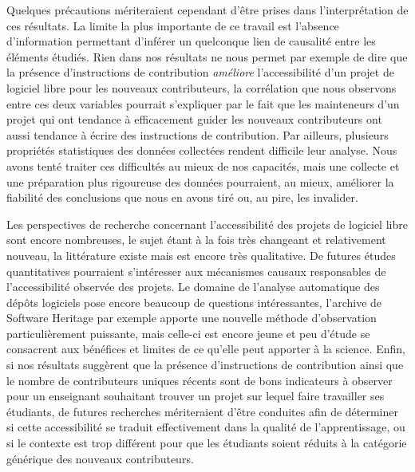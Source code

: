 \documentclass[dvipsnames,runningheads]{llncs}
\begin{document}
    Quelques précautions mériteraient cependant d'être prises dans l'interprétation de ces résultats. La
    limite la plus importante de ce travail est l'absence d'information permettant d'inférer un quelconque
    lien de causalité entre les éléments étudiés. Rien dans nos résultats ne nous permet par exemple de dire
    que la présence d'instructions de contribution \emph{améliore} l'accessibilité d'un projet de logiciel
    libre pour les nouveaux contributeurs, la corrélation que nous observons entre ces deux variables pourrait
    s'expliquer par le fait que les mainteneurs d'un projet qui ont tendance à efficacement guider les
    nouveaux contributeurs ont aussi tendance à écrire des instructions de contribution. Par ailleurs,
    plusieurs propriétés statistiques des données collectées rendent difficile leur analyse. Nous avons tenté
    traiter ces difficultés au mieux de nos capacités, mais une collecte et une préparation plus rigoureuse
    des données pourraient, au mieux, améliorer la fiabilité des conclusions que nous en avons tiré ou, au
    pire, les invalider.

    Les perspectives de recherche concernant l'accessibilité des projets de logiciel libre sont encore
    nombreuses, le sujet étant à la fois très changeant et relativement nouveau, la littérature existe mais
    est encore très qualitative. De futures études quantitatives pourraient s'intéresser aux mécanismes
    causaux responsables de l'accessibilité observée des projets. Le domaine de l'analyse automatique des
    dépôts logiciels pose encore beaucoup de questions intéressantes, l'archive de Software Heritage par
    exemple apporte une nouvelle méthode d'observation particulièrement puissante, mais celle-ci est encore
    jeune et peu d'étude se consacrent aux bénéfices et limites de ce qu'elle peut apporter à la science.
    Enfin, si nos résultats suggèrent que la présence d'instructions de contribution ainsi que le nombre de
    contributeurs uniques récents sont de bons indicateurs à observer pour un enseignant souhaitant trouver un
    projet sur lequel faire travailler ses étudiants, de futures recherches mériteraient d'être conduites afin
    de déterminer si cette accessibilité se traduit effectivement dans la qualité de l'apprentissage, ou si le
    contexte est trop différent pour que les étudiants soient réduits à la catégorie générique des nouveaux
    contributeurs.

    \printbibliography[heading=bibintoc]
\end{document}
